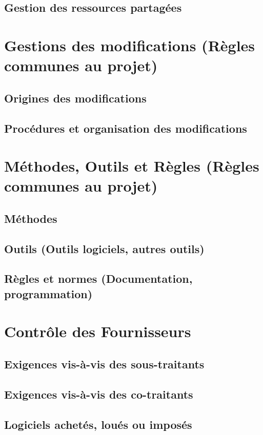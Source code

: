 \subsection{Gestion des ressources partagées}
\section{Gestions des modifications  (Règles communes au projet)}
\subsection{Origines des modifications}
\subsection{Procédures et organisation des modifications}

\section{Méthodes, Outils et Règles (Règles communes au projet)}
\subsection{Méthodes}
\subsection{Outils (Outils logiciels, autres outils)}
\subsection{Règles et normes   (Documentation, programmation)}		

\section{Contrôle des Fournisseurs}
\subsection{Exigences vis-à-vis des sous-traitants}
\subsection{Exigences vis-à-vis des co-traitants}
\subsection{Logiciels achetés, loués ou imposés}

